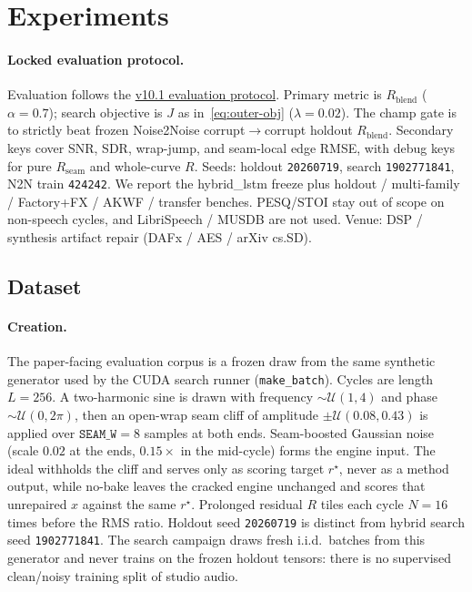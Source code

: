 \section{Experiments}
\label{sec:experiments}

\paragraph{Locked evaluation protocol.}
Evaluation follows the \href{https://github.com/reeldemo/denoise-opt-meta/blob/master/paper/Unsupervised_Wrap-Discontinuity_Repair_in_Wavetable_Synthesis_via_Hybrid_GA-PPO_Meta-Search_v12/EVAL_PROTOCOL.md}{v10.1 evaluation protocol}.
Primary metric is $R_{\mathrm{blend}}$ ($\alpha{=}0.7$); search objective is $J$ as in~\eqref{eq:outer-obj} ($\lambda{=}0.02$).
The champ gate is to strictly beat frozen Noise2Noise corrupt$\to$corrupt holdout $R_{\mathrm{blend}}$.
Secondary keys cover SNR, SDR, wrap-jump, and seam-local edge RMSE, with debug keys for pure $R_{\mathrm{seam}}$ and whole-curve $R$.
Seeds: holdout \texttt{20260719}, search \texttt{1902771841}, N2N train \texttt{424242}.
We report the hybrid\_lstm freeze plus holdout / multi-family / Factory+FX / AKWF / transfer benches.
PESQ/STOI stay out of scope on non-speech cycles, and LibriSpeech / MUSDB are not used.
Venue: DSP / synthesis artifact repair (DAFx / AES / arXiv cs.SD).

\subsection{Dataset}
\label{sec:dataset}

\paragraph{Creation.}
The paper-facing evaluation corpus is a frozen draw from the same synthetic generator used by the CUDA search runner (\texttt{make\_batch}).
Cycles are length $L{=}256$.
A two-harmonic sine is drawn with frequency $\sim\mathcal{U}(1,4)$ and phase $\sim\mathcal{U}(0,2\pi)$, then an open-wrap seam cliff of amplitude $\pm\mathcal{U}(0.08,0.43)$ is applied over $\texttt{SEAM\_W}{=}8$ samples at both ends.
Seam-boosted Gaussian noise (scale $0.02$ at the ends, $0.15\times$ in the mid-cycle) forms the engine input.
The ideal withholds the cliff and serves only as scoring target $r^{\star}$, never as a method output, while no-bake leaves the cracked engine unchanged and scores that unrepaired $x$ against the same $r^{\star}$.
Prolonged residual $R$ tiles each cycle $N{=}16$ times before the RMS ratio.
Holdout seed \texttt{20260719} is distinct from hybrid search seed \texttt{1902771841}.
The search campaign draws fresh i.i.d.\ batches from this generator and never trains on the frozen holdout tensors: there is no supervised clean/noisy training split of studio audio.

